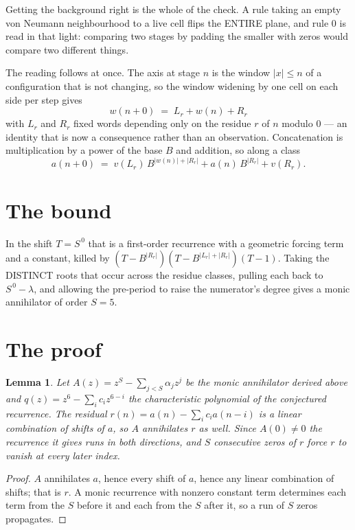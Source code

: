 \documentclass[11pt,a4paper]{article}
\theoremstyle{plain}
\newtheorem{lemma}[theorem]{Lemma}
\theoremstyle{definition}
\begin{document}
Getting the background right is the whole of the check. A rule taking an empty von Neumann
neighbourhood to a live cell flips the ENTIRE plane, and rule 0 is read
in that light: comparing two stages by padding the smaller with zeros would compare two
different things.

The reading follows at once. The axis at stage $n$ is the window $|x|\le n$ of a configuration
that is not changing, so the window widening by one cell on each side per step gives
\[
w(n+0)\;=\;L_r + w(n) + R_r
\]
with $L_r$ and $R_r$ fixed words depending only on the residue $r$ of $n$ modulo $0$ --- an
identity that is now a consequence rather than an observation. Concatenation is multiplication
by a power of the base $B$ and addition, so along a class
\[
a(n+0)\;=\;v(L_r)\,B^{|w(n)|+|R_r|} + a(n)\,B^{|R_r|} + v(R_r).
\]

\section{The bound}

In the shift $T=S^{\,0}$ that is a first-order recurrence with a geometric forcing term and a
constant, killed by $(T-B^{|R_r|})(T-B^{|L_r|+|R_r|})(T-1)$. Taking the DISTINCT roots that
occur across the residue classes, pulling each back to $S^{\,0}-\lambda$, and allowing the
pre-period to raise the numerator's degree gives a monic annihilator of order $S=5$.

\section{The proof}

\begin{lemma}\label{lem:crit}
Let $A(z)=z^S-\sum_{j<S}\alpha_jz^{j}$ be the monic annihilator derived above and
$q(z)=z^{6}-\sum_ic_iz^{6-i}$ the characteristic polynomial of the conjectured
recurrence. The residual $r(n)=a(n)-\sum_ic_ia(n-i)$ is a linear combination of shifts of $a$,
so $A$ annihilates $r$ as well. Since $A(0)\ne0$ the recurrence it gives runs in both
directions, and $S$ consecutive zeros of $r$ force $r$ to vanish at every later index.
\end{lemma}

\begin{proof}
$A$ annihilates $a$, hence every shift of $a$, hence any linear combination of shifts; that is
$r$. A monic recurrence with nonzero constant term determines each term from the $S$ before it
and each from the $S$ after it, so a run of $S$ zeros propagates.
\end{proof}
\end{document}
